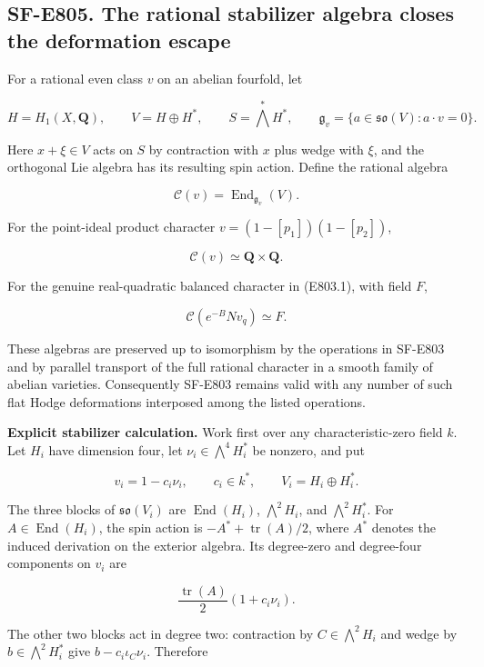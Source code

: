 \subsection{SF-E805. The rational stabilizer algebra closes the
deformation
escape}\label{SF-E805}

For a rational even class \(v\) on an abelian fourfold, let

\[
 H=H_1(X,\mathbf Q),\qquad
 V=H\oplus H^*,\qquad S=\bigwedge^*H^*,\qquad
 \mathfrak g_v=\{a\in\mathfrak{so}(V):a\cdot v=0\}.
\]

Here \(x+\xi\in V\) acts on \(S\) by contraction with \(x\) plus wedge
with \(\xi\), and the orthogonal Lie algebra has its resulting spin
action. Define the rational algebra

\[
 \mathcal C(v)=\operatorname{End}_{\mathfrak g_v}(V).
 \tag{E805.1}
\]

For the point-ideal product character \(v=(1-[p_1])(1-[p_2])\),

\[
 \mathcal C(v)\simeq\mathbf Q\times\mathbf Q.
 \tag{E805.2}
\]

For the genuine real-quadratic balanced character in (E803.1), with
field \(F\),

\[
 \mathcal C(e^{-B}Nv_q)\simeq F.
 \tag{E805.3}
\]

These algebras are preserved up to isomorphism by the operations in
SF-E803 and by parallel transport of the full rational character in a
smooth family of abelian varieties. Consequently SF-E803 remains valid
with any number of such flat Hodge deformations interposed among the
listed operations.

\textbf{Explicit stabilizer calculation.} Work first over any
characteristic-zero field \(k\). Let \(H_i\) have dimension four, let
\(\nu_i\in\bigwedge^4H_i^*\) be nonzero, and put

\[
 v_i=1-c_i\nu_i,\qquad c_i\in k^*,\qquad
 V_i=H_i\oplus H_i^*.
\]

The three blocks of \(\mathfrak{so}(V_i)\) are
\(\operatorname{End}(H_i)\), \(\bigwedge^2H_i\), and
\(\bigwedge^2H_i^*\). For \(A\in\operatorname{End}(H_i)\), the spin
action is \(-A^*+\operatorname{tr}(A)/2\), where \(A^*\) denotes the
induced derivation on the exterior algebra. Its degree-zero and
degree-four components on \(v_i\) are

\[
 \frac{\operatorname{tr}(A)}2(1+c_i\nu_i).
\]

The other two blocks act in degree two: contraction by
\(C\in\bigwedge^2H_i\) and wedge by \(b\in\bigwedge^2H_i^*\) give
\(b-c_i\iota_C\nu_i\). Therefore

